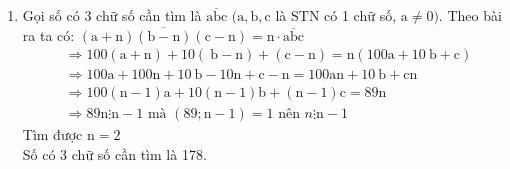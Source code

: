\begin{bt}
{\begin{enumerate}
$$\begin{aligned}
        & B=17 \cdot 18 \cdot 19 \cdot 5=29070
        \end{aligned}
        $$
        \item Gọi số có 3 chữ số cần tìm là $\overline{\mathrm{abc}}$ $(\mathrm{a}, \mathrm{b}, \mathrm{c}$ là $\mathrm{STN}$ có 1 chữ số, $\mathrm{a} \neq 0)$.
        Theo bài ra ta có: $\overline{(\mathrm{a}+\mathrm{n})(\mathrm{b}-\mathrm{n})(\mathrm{c}-\mathrm{n})}=\mathrm{n} \cdot \overline{\mathrm{abc}}$
        $$
        \begin{aligned}
        & \Rightarrow 100(\mathrm{a}+\mathrm{n})+10(\mathrm{~b}-\mathrm{n})+(\mathrm{c}-\mathrm{n})=\mathrm{n}(100 \mathrm{a}+10 \mathrm{~b}+\mathrm{c}) \\[5px]
        & \Rightarrow 100 \mathrm{a}+100 \mathrm{n}+10 \mathrm{~b}-10 \mathrm{n}+\mathrm{c}-\mathrm{n}=100 \mathrm{an}+10 \mathrm{~b}+\mathrm{cn} \\[5px]
        & \Rightarrow 100(\mathrm{n}-1) \mathrm{a}+10(\mathrm{n}-1) \mathrm{b}+(\mathrm{n}-1) \mathrm{c}=89 \mathrm{n} \\[5px]
        & \Rightarrow 89 \mathrm{n} \vdots \mathrm{n}-1 \text { mà }(89 ; \mathrm{n}-1)=1 \text { nên } n \vdots \mathrm{n}-1
        \end{aligned}
        $$
        Tìm được $\mathrm{n}=2$ \\[5px] 
        Số có 3 chữ số cần tìm là 178.
    \end{enumerate}
} 
\end{bt}

